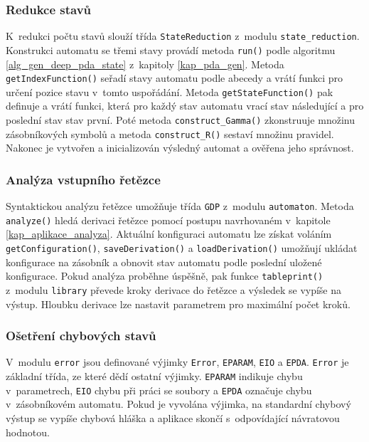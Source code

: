 \subsubsection{Redukce stavů}

K~redukci počtu stavů slouží třída \texttt{StateReduction} z~modulu \texttt{state\_reduction}. Konstrukci automatu se třemi stavy provádí metoda \texttt{run()} podle algoritmu \ref{alg_gen_deep_pda_state} z~kapitoly \ref{kap_pda_gen}. Metoda \texttt{getIndexFunction()} seřadí stavy automatu podle abecedy a vrátí funkci pro určení pozice stavu v~tomto uspořádání. Metoda \texttt{getStateFunction()} pak definuje a vrátí funkci, která pro každý stav automatu vrací stav následující a pro poslední stav stav první. Poté metoda \texttt{construct\_Gamma()} zkonstruuje množinu zásobníkových symbolů a metoda \texttt{construct\_R()} sestaví množinu pravidel. Nakonec je vytvořen a inicializován výsledný automat a ověřena jeho správnost.

\subsubsection{Analýza vstupního řetězce}
Syntaktickou analýzu řetězce umožňuje třída \texttt{GDP} z~modulu \texttt{automaton}. Metoda \texttt{analyze()} hledá derivaci řetězce pomocí postupu navrhovaném v~kapitole \ref{kap_aplikace_analyza}. Aktuální konfiguraci automatu lze získat voláním \texttt{getConfiguration()}, \texttt{saveDerivation()} a \texttt{loadDerivation()} umožňují ukládat konfigurace na zásobník a obnovit stav automatu podle poslední uložené konfigurace. Pokud analýza proběhne úspěšně, pak funkce \texttt{tableprint()} z~modulu \texttt{library} převede kroky derivace do řetězce a výsledek se vypíše na výstup. Hloubku derivace lze nastavit parametrem pro maximální počet kroků.

\subsubsection{Ošetření chybových stavů}

V~modulu \texttt{error} jsou definované výjimky \texttt{Error}, \texttt{EPARAM}, \texttt{EIO} a \texttt{EPDA}. \texttt{Error} je základní třída, ze které dědí ostatní výjimky. \texttt{EPARAM} indikuje chybu v~parametrech, \texttt{EIO} chybu při práci se soubory a \texttt{EPDA} označuje chybu v~zásobníkovém automatu. Pokud je vyvolána výjimka, na standardní chybový výstup se vypíše chybová hláška a aplikace skončí s~odpovídající návratovou hodnotou.

